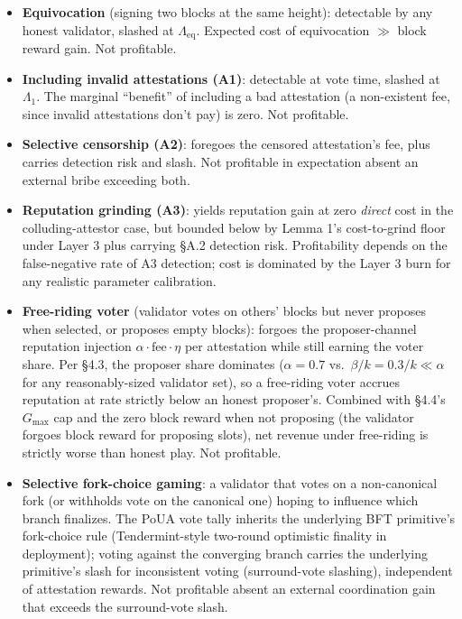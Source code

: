 \documentclass[
  11pt,
]{article}
\providecommand{\tightlist}{%
  \setlength{\itemsep}{0pt}\setlength{\parskip}{0pt}}
\begin{document}
\begin{itemize}
\tightlist
\item
  \textbf{Equivocation} (signing two blocks at the same height):
  detectable by any honest validator, slashed at
  \(\Lambda_{\text{eq}}\). Expected cost of equivocation \(\gg\) block
  reward gain. Not profitable.
\item
  \textbf{Including invalid attestations (A1)}: detectable at vote time,
  slashed at \(\Lambda_1\). The marginal ``benefit'' of including a bad
  attestation (a non-existent fee, since invalid attestations don't pay)
  is zero. Not profitable.
\item
  \textbf{Selective censorship (A2)}: foregoes the censored
  attestation's fee, plus carries detection risk and slash. Not
  profitable in expectation absent an external bribe exceeding both.
\item
  \textbf{Reputation grinding (A3)}: yields reputation gain at zero
  \emph{direct} cost in the colluding-attestor case, but bounded below
  by Lemma 1's cost-to-grind floor under Layer 3 plus carrying §A.2
  detection risk. Profitability depends on the false-negative rate of A3
  detection; cost is dominated by the Layer 3 burn for any realistic
  parameter calibration.
\item
  \textbf{Free-riding voter} (validator votes on others' blocks but
  never proposes when selected, or proposes empty blocks): forgoes the
  proposer-channel reputation injection
  \(\alpha \cdot \text{fee} \cdot \eta\) per attestation while still
  earning the voter share. Per §4.3, the proposer share dominates
  (\(\alpha = 0.7\) vs.~\(\beta/k = 0.3/k \ll \alpha\) for any
  reasonably-sized validator set), so a free-riding voter accrues
  reputation at rate strictly below an honest proposer's. Combined with
  §4.4's \(G_{\max}\) cap and the zero block reward when not proposing
  (the validator forgoes block reward for proposing slots), net revenue
  under free-riding is strictly worse than honest play. Not profitable.
\item
  \textbf{Selective fork-choice gaming}: a validator that votes on a
  non-canonical fork (or withholds vote on the canonical one) hoping to
  influence which branch finalizes. The PoUA vote tally inherits the
  underlying BFT primitive's fork-choice rule (Tendermint-style
  two-round optimistic finality in deployment); voting against the
  converging branch carries the underlying primitive's slash for
  inconsistent voting (surround-vote slashing), independent of
  attestation rewards. Not profitable absent an external coordination
  gain that exceeds the surround-vote slash.
\end{itemize}
\end{document}

